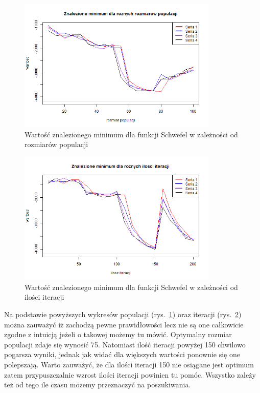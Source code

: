 \documentclass[11pt, a4paper]{article}
\newcommand{\fbi}{\leavevmode{\parindent=1em\indent}}
\begin{document}
\begin{figure}[H]
	\begin{center}
		\includegraphics[width=0.85\textwidth]{./assets/Schwefel4.png}
		\caption{Wartość znalezionego minimum dla funkcji Schwefel w zależności od rozmiarów populacji}
		\label{fig:schwefel4}
	\end{center}
\end{figure}

\begin{figure}[H]
	\begin{center}
		\includegraphics[width=0.85\textwidth]{./assets/Schwefel5.png}
		\caption{Wartość znalezionego minimum dla funkcji Schwefel w zależności od ilości iteracji}
		\label{fig:schwefel5}
	\end{center}
\end{figure}

\fbi
Na podstawie powyższych wykresów populacji (rys.~\ref{fig:schwefel4}) oraz iteracji (rys.~\ref{fig:schwefel5}) można zauważyć iż zachodzą pewne prawidłowości lecz nie są one całkowicie zgodne z intuicją jeżeli o takowej możemy tu mówić. Optymalny rozmiar populacji zdaje się wynosić 75. Natomiast ilość iteracji powyżej 150 chwilowo pogarsza wyniki, jednak jak widać dla większych wartości ponownie się one polepszają. Warto zauważyć, że dla ilości iteracji 150 nie osiągane jest optimum zatem przypuszczalnie wzrost ilości iteracji powinien tu pomóc. Wszystko zależy też od tego ile czasu możemy przeznaczyć na poszukiwania.
\end{document}
